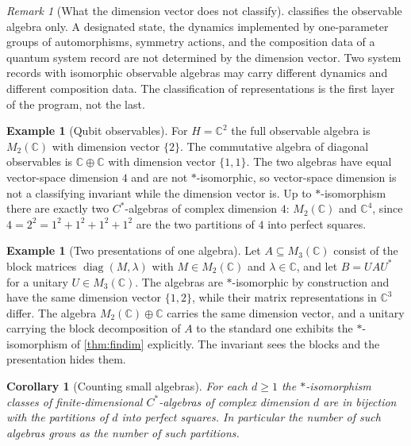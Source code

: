 \documentclass[11pt,letterpaper]{article}
\newtheorem{corollary}[theorem]{Corollary}
\theoremstyle{definition}
\newtheorem{example}[theorem]{Example}
\theoremstyle{remark}
\newtheorem{remark}[theorem]{Remark}
\begin{document}
\begin{remark}[What the dimension vector does not classify]
\label{rem:dimvec}
 classifies the observable algebra only. A designated state, the dynamics implemented by one-parameter groups of automorphisms, symmetry actions, and the composition data of a quantum system record are not determined by the dimension vector. Two system records with isomorphic observable algebras may carry different dynamics and different composition data. The classification of representations is the first layer of the program, not the last.
\end{remark}

\begin{example}[Qubit observables]
\label{ex:qubit}
For $H = \mathbb{C}^2$ the full observable algebra is $M_2(\mathbb{C})$ with dimension vector $\{2\}$. The commutative algebra of diagonal observables is $\mathbb{C} \oplus \mathbb{C}$ with dimension vector $\{1, 1\}$. The two algebras have equal vector-space dimension $4$ and are not $*$-isomorphic, so vector-space dimension is not a classifying invariant while the dimension vector is. Up to $*$-isomorphism there are exactly two $C^*$-algebras of complex dimension $4$: $M_2(\mathbb{C})$ and $\mathbb{C}^4$, since $4 = 2^2 = 1^2 + 1^2 + 1^2 + 1^2$ are the two partitions of $4$ into perfect squares.
\end{example}

\begin{example}[Two presentations of one algebra]
\label{ex:iso}
Let $A \subseteq M_3(\mathbb{C})$ consist of the block matrices $\operatorname{diag}(M, \lambda)$ with $M \in M_2(\mathbb{C})$ and $\lambda \in \mathbb{C}$, and let $B = U A U^*$ for a unitary $U \in M_3(\mathbb{C})$. The algebras are $*$-isomorphic by construction and have the same dimension vector $\{1, 2\}$, while their matrix representations in $\mathbb{C}^3$ differ. The algebra $M_2(\mathbb{C}) \oplus \mathbb{C}$ carries the same dimension vector, and a unitary carrying the block decomposition of $A$ to the standard one exhibits the $*$-isomorphism of \cref{thm:findim} explicitly. The invariant sees the blocks and the presentation hides them.
\end{example}

\begin{corollary}[Counting small algebras]
\label{cor:count}
For each $d \geq 1$ the $*$-isomorphism classes of finite-dimensional $C^*$-algebras of complex dimension $d$ are in bijection with the partitions of $d$ into perfect squares. In particular the number of such algebras grows as the number of such partitions.
\end{corollary}
\end{document}
